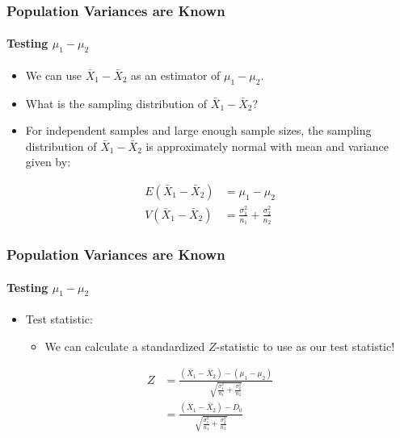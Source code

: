 \documentclass[12pt]{beamer}
\begin{document}
\begin{frame}
	\frametitle{Population Variances are Known}
	\framesubtitle{Testing $\mu_1 - \mu_2$}
	
	\begin{itemize}[label={\color{blue}$\blacktriangleright$}]
		\item We can use $\bar{X}_1 - \bar{X}_2$ as an estimator of $\mu_1 - \mu_2$.
		\item What is the sampling distribution of $\bar{X}_1 - \bar{X}_2$?
		\item For independent samples and large enough sample sizes, the sampling distribution of $\bar{X}_1 - \bar{X}_2$ is approximately normal with mean and variance given by:
	\end{itemize}

	\begin{align*}
		E(\bar{X}_1 - \bar{X}_2) &= \mu_1 - \mu_2 \\[0.5cm]
		V(\bar{X}_1 - \bar{X}_2) &= \frac{\sigma_1^2}{n_1} + \frac{\sigma_2^2}{n_2}
	\end{align*}
	
\end{frame}
\begin{frame}
	\frametitle{Population Variances are Known}
	\framesubtitle{Testing $\mu_1 - \mu_2$}
	
	\begin{itemize}[label={\color{blue}$\blacktriangleright$}]
		\item Test statistic:
		\begin{itemize}[label={\color{blue}$\blacktriangleright$}]
			\item We can calculate a standardized $Z$-statistic to use as our test statistic!
		\end{itemize}
	\end{itemize}
	
	\begin{align*}
		Z &= \frac{(\bar{X}_1 - \bar{X}_2) - (\mu_1 - \mu_2)}{\sqrt{\frac{\sigma_1^2}{n_1} + \frac{\sigma_2^2}{n_2}}} \\[1cm]
		&= \frac{(\bar{X}_1 - \bar{X}_2) - D_0}{\sqrt{\frac{\sigma_1^2}{n_1} + \frac{\sigma_2^2}{n_2}}}
	\end{align*}
	
\end{frame}
\end{document}

